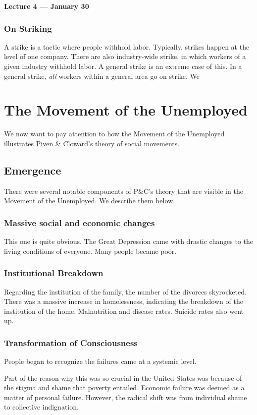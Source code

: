 \noindent \textbf{Lecture 4 --- January 30\th}

\subsubsection{On Striking}
A strike is a tactic where people withhold labor.
Typically, strikes happen at the level of one company.
There are also industry-wide strike, in which workers of a given industry withhold labor.
A general strike is an extreme case of this.
In a general strike, \textit{all} workers within a general area go on strike.
We

\section{The Movement of the Unemployed}
We now want to pay attention to how the Movement of the Unemployed illustrates Piven \& Cloward's theory of social movements.

\subsection{Emergence}
There were several notable components of P\&C's theory that are visible in the Movement of the Unemployed.
We describe them below.

\subsubsection{Massive social and economic changes}
This one is quite obvious.
The Great Depression came with drastic changes to the living conditions of everyone.
Many people became poor.


\subsubsection{Institutional Breakdown}
Regarding the institution of the family, the number of the divorces skyrocketed.
There was a massive increase in homelessness, indicating the breakdown of the institution of the home.
Malnutrition and disease rates.
Suicide rates also went up.

\subsubsection{Transformation of Consciousness}
People began to recognize the failures came at a systemic level.

Part of the reason why this was so crucial in the United States was because of the stigma and shame that poverty entailed.
Economic failure was deemed as a matter of personal failure.
However, the radical shift was from individual shame to collective indignation.

